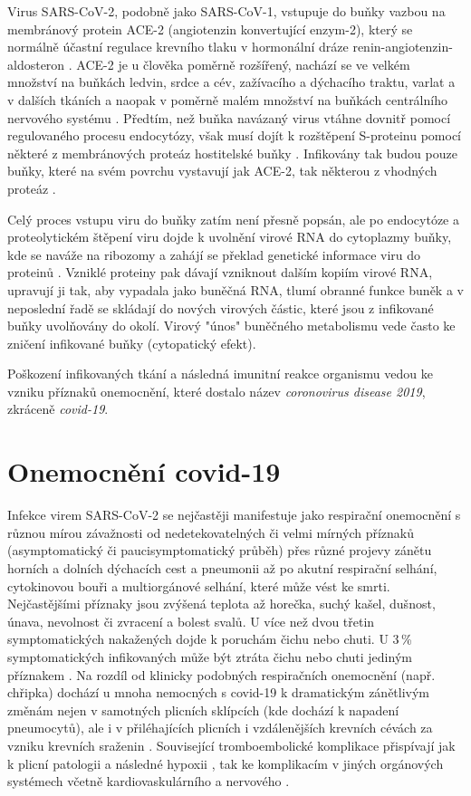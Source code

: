 Virus SARS-CoV-2, podobně jako SARS-CoV-1, vstupuje do buňky vazbou na membránový protein ACE-2 (angiotenzin konvertující enzym-2), který se normálně účastní regulace krevního tlaku v hormonální dráze renin-angiotenzin-aldosteron \cite{Li:2017}. ACE-2 je u člověka poměrně rozšířený, nachází se ve velkém množství na buňkách ledvin, srdce a cév, zažívacího a dýchacího traktu, varlat a v dalších tkáních a naopak v poměrně malém množství na buňkách centrálního nervového systému \cite{Harmer:2002}. Předtím, než buňka navázaný virus vtáhne dovnitř pomocí regulovaného procesu endocytózy, však musí dojít k rozštěpení S-proteinu pomocí některé z membránových proteáz hostitelské buňky \cite{Hoffmann:2020}. Infikovány tak budou pouze buňky, které na svém povrchu vystavují jak ACE-2, tak některou z vhodných proteáz \cite{Murgolo:2021}.

Celý proces vstupu viru do buňky zatím není přesně popsán, ale po endocytóze a proteolytickém štěpení viru dojde k uvolnění virové RNA do cytoplazmy buňky, kde se naváže na ribozomy a zahájí se překlad genetické informace viru do proteinů \cite{Khan:2020}. Vzniklé proteiny pak dávají vzniknout dalším kopiím virové RNA, upravují ji tak, aby vypadala jako buněčná RNA, tlumí obranné funkce buněk a v neposlední řadě se skládají do nových virových částic, které jsou z infikované buňky uvolňovány do okolí. Virový "únos" buněčného metabolismu vede často ke zničení infikované buňky (cytopatický efekt).

Poškození infikovaných tkání a následná imunitní reakce organismu vedou ke vzniku příznaků onemocnění, které dostalo název \textit{coronovirus disease 2019}, zkráceně \textit{covid-19}.

\section*{Onemocnění covid-19}

Infekce virem SARS-CoV-2 se nejčastěji manifestuje jako respirační onemocnění s různou mírou závažnosti od nedetekovatelných či velmi mírných příznaků (asymptomatický či paucisymptomatický průběh) přes různé projevy zánětu horních a dolních dýchacích cest a pneumonii až po akutní respirační selhání, cytokinovou bouři a multiorgánové selhání, které může vést ke smrti. Nejčastějšími příznaky jsou zvýšená teplota až horečka, suchý kašel, dušnost, únava, nevolnost či zvracení a bolest svalů. U více než dvou třetin symptomatických nakažených dojde k poruchám čichu nebo chuti. U 3\,\% symptomatických infikovaných může být ztráta čichu nebo chuti jediným příznakem \cite{Xie:2020,Wiersinga:2020}. Na rozdíl od klinicky podobných respiračních onemocnění (např. chřipka) dochází u mnoha nemocných s covid-19 k dramatickým zánětlivým změnám nejen v samotných plicních sklípcích (kde dochází k napadení pneumocytů), ale i v přiléhajících plicních i vzdálenějších krevních cévách za vzniku krevních sraženin \cite{Ackermann:2020}. Související tromboembolické komplikace přispívají jak k plicní patologii a následné hypoxii \cite{McGonagle:2021}, tak ke komplikacím v jiných orgánových systémech včetně kardiovaskulárního a nervového \cite{Gupta:2020}.

